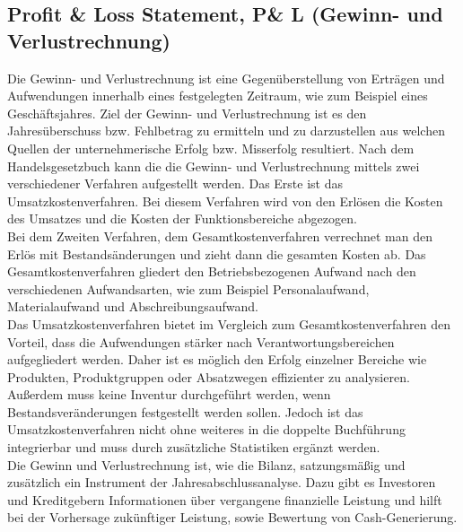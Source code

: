 \subsection{Profit \& Loss Statement, P\& L (Gewinn- und Verlustrechnung)}
Die Gewinn- und Verlustrechnung ist eine Gegenüberstellung von Erträgen und Aufwendungen innerhalb eines festgelegten Zeitraum, wie zum Beispiel eines Geschäftsjahres. Ziel der Gewinn- und Verlustrechnung ist es den Jahresüberschuss bzw. Fehlbetrag zu ermitteln und zu darzustellen aus welchen Quellen der unternehmerische Erfolg bzw. Misserfolg resultiert. Nach dem Handelsgesetzbuch kann die die Gewinn- und Verlustrechnung mittels zwei verschiedener Verfahren aufgestellt werden. Das Erste ist das Umsatzkostenverfahren. Bei diesem Verfahren wird von den Erlösen die Kosten des Umsatzes und die Kosten der Funktionsbereiche abgezogen.
\\
Bei dem Zweiten Verfahren, dem Gesamtkostenverfahren verrechnet man den Erlös mit Bestandsänderungen und zieht dann die gesamten Kosten ab. Das Gesamtkostenverfahren gliedert den Betriebsbezogenen Aufwand nach den verschiedenen Aufwandsarten, wie zum Beispiel Personalaufwand, Materialaufwand und Abschreibungsaufwand.
\\
Das Umsatzkostenverfahren bietet im Vergleich zum Gesamtkostenverfahren den Vorteil, dass die Aufwendungen stärker nach Verantwortungsbereichen aufgegliedert werden. Daher ist es möglich den Erfolg einzelner Bereiche wie Produkten, Produktgruppen oder Absatzwegen effizienter zu analysieren. Außerdem muss keine Inventur durchgeführt werden, wenn Bestandsveränderungen festgestellt werden sollen.
Jedoch ist das Umsatzkostenverfahren nicht ohne weiteres in die doppelte Buchführung integrierbar und muss durch zusätzliche Statistiken ergänzt werden.
\\
Die Gewinn und Verlustrechnung ist,  wie die Bilanz, satzungsmäßig und zusätzlich ein Instrument der Jahresabschlussanalyse. Dazu gibt es Investoren und Kreditgebern Informationen über vergangene finanzielle Leistung und hilft bei der Vorhersage zukünftiger Leistung, sowie Bewertung von Cash-Generierung.


